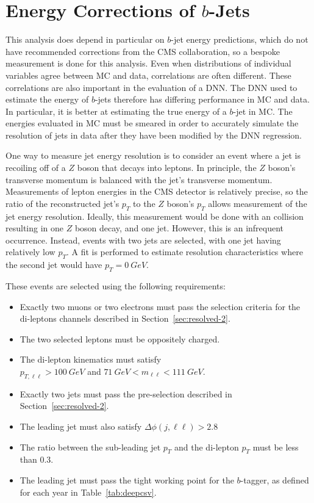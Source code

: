 
\section{Energy Corrections of $b$-Jets}

This analysis does depend in particular on $b$-jet energy predictions,
which do not have recommended corrections from the CMS collaboration,
so a bespoke measurement is done for this analysis.
Even when distributions of individual variables agree between MC and data,
correlations are often different.
These correlations are also important in the evaluation of a DNN.
The DNN used to estimate the energy of $b$-jets therefore has differing performance
in MC and data.
In particular, it is better at estimating the true energy of a $b$-jet in MC.
The energies evaluated in MC must be smeared in order to accurately simulate
the resolution of jets in data after they have been modified by the DNN regression.

One way to measure jet energy resolution is to consider an event
where a jet is recoiling off of a $Z$ boson that decays into leptons.
In principle, the $Z$ boson's transverse momentum is balanced with the
jet's transverse momentum.
Measurements of lepton energies in the CMS detector is relatively precise,
so the ratio of the reconstructed jet's
$p_T$ to the $Z$ boson's $p_T$ allows measurement of the jet energy resolution.
Ideally, this measurement would be done with an collision resulting in one $Z$ boson decay,
and one jet.
However, this is an infrequent occurrence.
Instead, events with two jets are selected, with one jet having relatively low $p_T$.
A fit is performed to estimate resolution characteristics
where the second jet would have $p_T = \SI{0}{GeV}$.

These events are selected using the following requirements:

\begin{itemize}
\item Exactly two muons or two electrons must pass the selection criteria for the
  di-leptons channels described in Section~\ref{sec:resolved-2}.
\item The two selected leptons must be oppositely charged.
\item The di-lepton kinematics must satisfy \\ $p_{T,\ell\ell} > \SI{100}{GeV}$ and
  $\SI{71}{GeV} < m_{\ell\ell} < \SI{111}{GeV}$.
\item Exactly two jets must pass the pre-selection described in Section~\ref{sec:resolved-2}.
\item The leading jet must also satisfy $\Delta\phi(j, \ell\ell) > 2.8$
\item The ratio between the sub-leading jet $p_T$ and
  the di-lepton $p_T$ must be less than 0.3.
\item The leading jet must pass the tight working point for the $b$-tagger,
  as defined for each year in Table~\ref{tab:deepcsv}.
\end{itemize}

